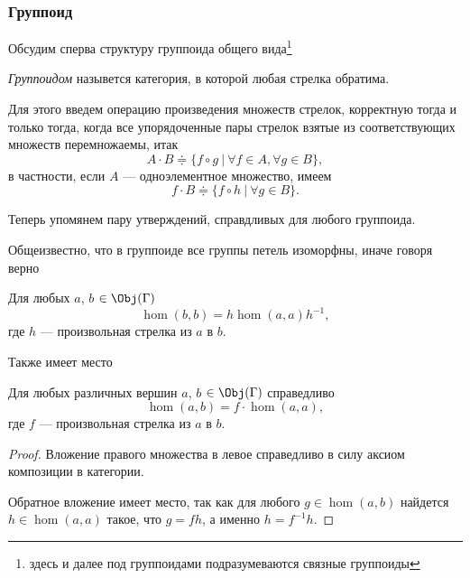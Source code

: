 \subsubsection{Группоид}
    Обсудим сперва структуру группоида общего вида\footnote{здесь и далее под 
    группоидами подразумеваются связные группоиды}
    \begin{definition}\cite{MacLane}
        \emph{Группоидом} назывется категория, в которой любая стрелка обратима.
    \end{definition}

    Для этого введем операцию произведения множеств стрелок, корректную тогда и 
    только тогда, когда все упорядоченные пары стрелок взятые из 
    соответствующих множеств перемножаемы, итак
    \begin{equation}\label{cdot_def}
        A \cdot B \doteqdot \{f\circ g \:|\: \forall f \in A, \forall g \in B\},
    \end{equation}
    в частности, если $A$ --- одноэлементное множество, имеем
    \[f \cdot B \doteqdot \{f\circ h \:|\: \forall g \in B\}.\]

    Теперь упомянем пару утверждений, справдливых для любого группоида.

    \bigskip

    Общеизвестно, что в группоиде все группы петель изоморфны, иначе говоря 
    верно
    \begin{statement}\label{st_loop_iso}
        Для любых $a$, $b$ $\in \Obj(\Gamma)$
        \begin{equation}
            \hom(b,b) = h\hom(a,a)h^{-1},
        \end{equation}
        где $h$ --- произвольная стрелка из $a$ в $b$.
    \end{statement}

    \bigskip

    Также имеет место
    \begin{statement}\label{st_gr_shift}
        Для любых различных вершин $a$, $b$ $\in \Obj(\Gamma)$ справедливо
        \begin{equation}\label{eq_fhom}
            \hom(a,b) = f \cdot \hom(a,a),
        \end{equation}
        где $f$ --- произвольная стрелка из $a$ в $b$.
    \end{statement}
    \begin{proof}
        Вложение правого множества в левое справедливо в силу аксиом 
        композиции в категории.
    
        Обратное вложение имеет место, так как для любого $g \in \hom(a,b)$ 
        найдется $h \in \hom(a,a)$ такое, что $g = fh$, а именно $h = f^{-1}h$.
    \end{proof}

